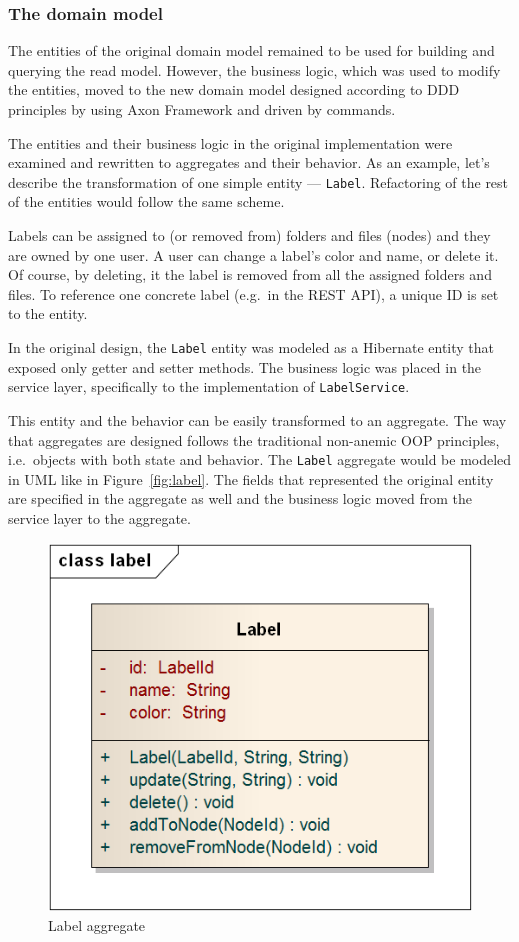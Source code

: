 \documentclass{book}
\begin{document}
\subsubsection{The domain model}\label{the-domain-model}

The entities of the original domain model remained to be used for
building and querying the read model. However, the business logic, which
was used to modify the entities, moved to the new domain model designed
according to DDD principles by using Axon Framework and driven by
commands.

The entities and their business logic in the original implementation
were examined and rewritten to aggregates and their behavior. As an
example, let's describe the transformation of one simple entity ---
\texttt{Label}. Refactoring of the rest of the entities would follow the
same scheme.

Labels can be assigned to (or removed from) folders and files (nodes)
and they are owned by one user. A user can change a label's color and
name, or delete it. Of course, by deleting, it the label is removed from
all the assigned folders and files. To reference one concrete label
(e.g.~in the REST API), a unique ID is set to the entity.

In the original design, the \texttt{Label} entity was modeled as a
Hibernate entity that exposed only getter and setter methods. The
business logic was placed in the service layer, specifically to the
implementation of \texttt{LabelService}.

This entity and the behavior can be easily transformed to an aggregate.
The way that aggregates are designed follows the traditional non-anemic
OOP principles, i.e.~objects with both state and behavior. The
\texttt{Label} aggregate would be modeled in UML like in Figure~\ref{fig:label}. The fields that represented the original entity are
specified in the aggregate as well and the business logic moved from the
service layer to the aggregate.


\begin{figure}[h!]
\begin{center}
\includegraphics[width=0.35\columnwidth]{figures/label/label}
\caption{Label aggregate%
}
\end{center}
\end{figure}
\end{document}
